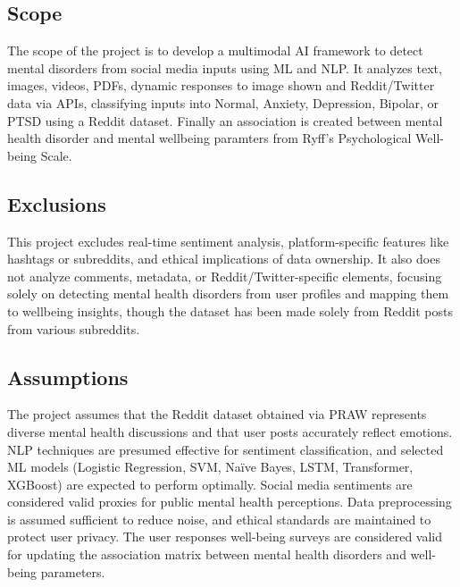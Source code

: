 \subsection{Scope}
\noindent
The scope of the project is to develop a multimodal AI framework to detect mental disorders from social media inputs using ML and NLP. It analyzes text, images, videos, PDFs, dynamic responses to image shown and Reddit/Twitter data via APIs, classifying inputs into Normal, Anxiety, Depression, Bipolar, or PTSD using a Reddit dataset. Finally an association is created between mental health disorder and mental wellbeing paramters from Ryff's Psychological Well-being Scale.

\subsection{Exclusions}
\noindent
This project excludes real-time sentiment analysis, platform-specific features like hashtags or subreddits, and ethical implications of data ownership. It also does not analyze comments, metadata, or Reddit/Twitter-specific elements, focusing solely on detecting mental health disorders from user profiles and mapping them to wellbeing insights, though the dataset has been made solely from Reddit posts from various subreddits.

\subsection{Assumptions}
\noindent
The project assumes that the Reddit dataset obtained via PRAW represents diverse mental health discussions and that user posts accurately reflect emotions. NLP techniques are presumed effective for sentiment classification, and selected ML models (Logistic Regression, SVM, Naïve Bayes, LSTM, Transformer, XGBoost) are expected to perform optimally. Social media sentiments are considered valid proxies for public mental health perceptions. Data preprocessing is assumed sufficient to reduce noise, and ethical standards are maintained to protect user privacy. The user responses well-being surveys are considered valid for updating the association matrix between mental health disorders and well-being parameters.


